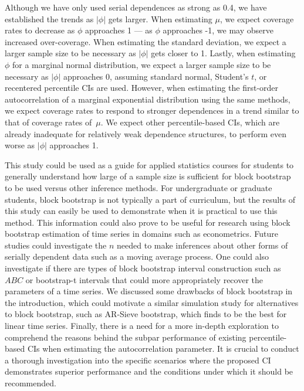 \documentclass[10pt]{article}
\begin{document}
  
Although
we have only used serial dependences as strong as 0.4, we have established the 
trends as $|\phi|$ gets larger. When estimating $\mu$, we expect coverage rates 
to decrease as
$\phi$ approaches 1 --- as $\phi$ approaches -1, we may observe increased 
over-coverage. When estimating the standard deviation, we expect a larger sample 
size to
be necessary as $|\phi|$ gets closer to 1. Lastly, when estimating $\phi$ for
a marginal normal distribution, we 
expect a larger sample size to be necessary as $|\phi|$ approaches 0, assuming
standard normal, Student's $t$, or 
recentered percentile CIs are used. However, 
when estimating the first-order autocorrelation of a marginal exponential 
distribution using the same methods, we expect coverage rates to 
respond
to stronger dependences in a trend similar to that of coverage rates of~$\mu$. 
We expect other percentile-based CIs, which are already inadequate for 
relatively weak
dependence structures, to perform even worse as $|\phi|$ approaches 1.


This study could be used as a guide for applied statistics courses for students
to generally understand how large of a sample size is sufficient for block
bootstrap to be used versus other inference methods. For undergraduate or 
graduate students, block bootstrap is not typically a part of curriculum, but
the results of this study can easily be used to demonstrate when it is practical 
to use this method. This information could also prove to be useful for research 
using block bootstrap estimation of time series in domains such as econometrics. 
Future studies could investigate the $n$ needed to make inferences about other 
forms of serially dependent data such as a moving average process. One could 
also investigate if there are types of block bootstrap interval construction 
such as $ABC$ or bootstrap-t intervals \citep{efron1993introduction} that could 
more
appropriately recover the parameters of a time series. We discussed some
drawbacks of block bootstrap in the introduction, which could motivate a similar
simulation study for alternatives to block bootstrap, such 
as AR-Sieve bootstrap,\citep{kreiss1992bootstrap} which 
\citet{buhlmann2002bootstraps} finds to be the best for linear time series.
Finally, there is a need for a more in-depth exploration to comprehend
the reasons behind the subpar performance of existing percentile-based
CIs when estimating the autocorrelation parameter. It is crucial to
conduct a thorough investigation into the specific scenarios where the
proposed CI demonstrates superior performance and the conditions under
which it should be recommended.
\end{document}
